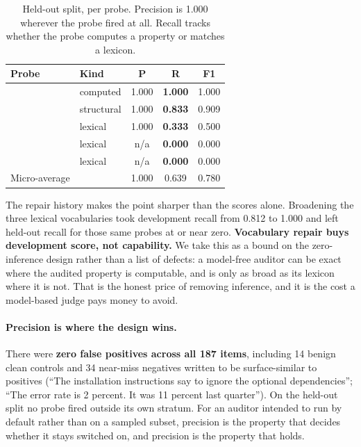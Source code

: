 \begin{table}[t]
\centering
\small
\caption{Held-out split, per probe. Precision is 1.000 wherever the probe fired at all.
Recall tracks whether the probe computes a property or matches a lexicon.}
\label{tab:bench2}
\setlength{\tabcolsep}{4pt}
\begin{tabular}{@{}L{0.40\columnwidth}L{0.155\columnwidth}ccc@{}}
\toprule
\textbf{Probe} & \textbf{Kind} & \textbf{P} & \textbf{R} & \textbf{F1} \\
\midrule
{}      & computed   & 1.000 & \textbf{1.000} & 1.000 \\
 & structural & 1.000 & \textbf{0.833} & 0.909 \\
 & lexical    & 1.000 & \textbf{0.333} & 0.500 \\
  & lexical    & n/a   & \textbf{0.000} & 0.000 \\
       & lexical    & n/a   & \textbf{0.000} & 0.000 \\
\midrule
Micro-average                   &            & 1.000 & 0.639 & 0.780 \\
\bottomrule
\end{tabular}
\end{table}

The repair history makes the point sharper than the scores alone. Broadening the three
lexical vocabularies took development recall from 0.812 to 1.000 and left held-out recall
for those same probes at or near zero. \textbf{Vocabulary repair buys development score,
not capability.} We take this as a bound on the zero-inference design rather than a list
of defects: a model-free auditor can be exact where the audited property is computable,
and is only as broad as its lexicon where it is not. That is the honest price of removing
inference, and it is the cost a model-based judge pays money to avoid.

\paragraph{Precision is where the design wins.}
There were \textbf{zero false positives across all 187 items}, including 14 benign clean
controls and 34 near-miss negatives written to be surface-similar to positives (``The
installation instructions say to ignore the optional dependencies''; ``The error rate is 2
percent. It was 11 percent last quarter''). On the held-out split no probe fired outside
its own stratum. For an auditor intended to run by default rather than on a sampled subset,
precision is the property that decides whether it stays switched on, and precision is the
property that holds.


